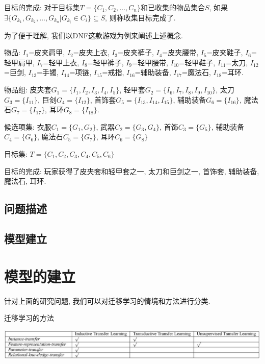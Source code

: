 \documentclass[10pt,journal,compsoc]{IEEEtran}
\begin{document}
  目标的完成: 
  对于目标集$T = \{C_1, C_2, \dots, C_n\}$和已收集的物品集合$S$, 如果$\exists \{G_{k_1}, G_{k_2}, \dots, G_{k_n} | G_{k_i} \in C_i\} \subseteq S$, 则称收集目标完成了.
  
  
  为了便于理解, 我们以DNF这款游戏为例来阐述上述概念.
  
  物品: $I_1$=皮夹肩甲, $I_2$=皮夹上衣, $I_3$=皮夹裤子, $I_4$=皮夹腰带, $I_5$=皮夹鞋子, $I_6$=轻甲肩甲, $I_7$=轻甲上衣, $I_8$=轻甲裤子, $I_9$=轻甲腰带, $I_{10}$=轻甲鞋子, $I_{11}$=太刀, $I_{12}$=巨剑, $I_{13}$=手镯, $I_{14}$=项链, $I_{15}$=戒指, $I_{16}$=辅助装备, $I_{17}$=魔法石, $I_{18}$=耳环. 
  
  物品组: 皮夹套$G_1=\{I_1, I_2, I_3, I_4, I_5\}$, 轻甲套$G_2=\{I_6, I_7, I_8, I_9, I_{10}\}$, 太刀$G_3=\{I_{11}\}$, 巨剑$G_4=\{I_{12}\}$, 首饰套$G_5=\{I_{13}, I_{14}, I_{15}\}$, 辅助装备$G_6=\{I_{16}\}$, 魔法石$G_7=\{I_{17}\}$, 耳环$G_8=\{I_{18}\}$.
  
  候选项集: 衣服$C_1=\{G_1, G_2\}$, 武器$C_2=\{G_3, G_4\}$, 首饰$C_3=\{G_5\}$, 辅助装备$C_4=\{G_6\}$, 魔法石$C_5=\{G_7\}$, 耳环$C_6=\{G_8\}$
  
  目标集: $T=\{C_1, C_2, C_3, C_4, C_5, C_6\}$
  
  目标的完成: 玩家获得了皮夹套和轻甲套之一, 太刀和巨剑之一, 首饰套, 辅助装备, 魔法石, 耳环. 




\subsection{问题描述}


\subsection{模型建立}






\section{模型的建立}

针对上面的研究问题, 我们可以对迁移学习的情境和方法进行分类. 

\begin{table}[!ht]
\centering
\caption{迁移学习的方法}
\label{tab:survey_method}
\includegraphics[width=40pc]{img/survey_tab3.jpg}
\end{table}
\end{document}
